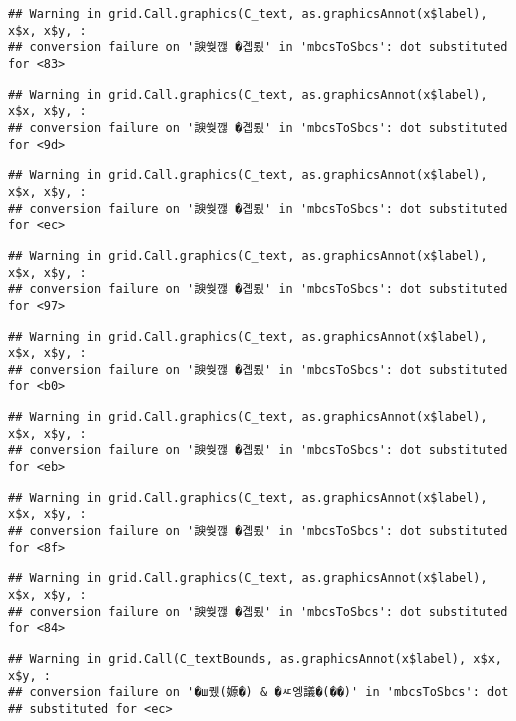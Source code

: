 \documentclass[
]{article}
\begin{document}
\begin{verbatim}
## Warning in grid.Call.graphics(C_text, as.graphicsAnnot(x$label), x$x, x$y, :
## conversion failure on '諛쒖깮 �곕룄' in 'mbcsToSbcs': dot substituted for <83>
\end{verbatim}

\begin{verbatim}
## Warning in grid.Call.graphics(C_text, as.graphicsAnnot(x$label), x$x, x$y, :
## conversion failure on '諛쒖깮 �곕룄' in 'mbcsToSbcs': dot substituted for <9d>
\end{verbatim}

\begin{verbatim}
## Warning in grid.Call.graphics(C_text, as.graphicsAnnot(x$label), x$x, x$y, :
## conversion failure on '諛쒖깮 �곕룄' in 'mbcsToSbcs': dot substituted for <ec>
\end{verbatim}

\begin{verbatim}
## Warning in grid.Call.graphics(C_text, as.graphicsAnnot(x$label), x$x, x$y, :
## conversion failure on '諛쒖깮 �곕룄' in 'mbcsToSbcs': dot substituted for <97>
\end{verbatim}

\begin{verbatim}
## Warning in grid.Call.graphics(C_text, as.graphicsAnnot(x$label), x$x, x$y, :
## conversion failure on '諛쒖깮 �곕룄' in 'mbcsToSbcs': dot substituted for <b0>
\end{verbatim}

\begin{verbatim}
## Warning in grid.Call.graphics(C_text, as.graphicsAnnot(x$label), x$x, x$y, :
## conversion failure on '諛쒖깮 �곕룄' in 'mbcsToSbcs': dot substituted for <eb>
\end{verbatim}

\begin{verbatim}
## Warning in grid.Call.graphics(C_text, as.graphicsAnnot(x$label), x$x, x$y, :
## conversion failure on '諛쒖깮 �곕룄' in 'mbcsToSbcs': dot substituted for <8f>
\end{verbatim}

\begin{verbatim}
## Warning in grid.Call.graphics(C_text, as.graphicsAnnot(x$label), x$x, x$y, :
## conversion failure on '諛쒖깮 �곕룄' in 'mbcsToSbcs': dot substituted for <84>
\end{verbatim}

\begin{verbatim}
## Warning in grid.Call(C_textBounds, as.graphicsAnnot(x$label), x$x, x$y, :
## conversion failure on '�ш퀬(嫄�) & �ㅼ엥議�(��)' in 'mbcsToSbcs': dot
## substituted for <ec>
\end{verbatim}
\end{document}
